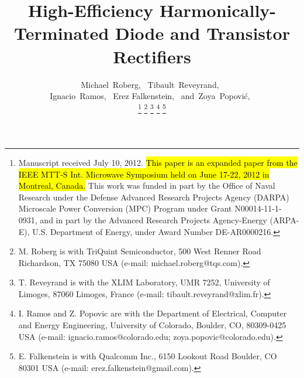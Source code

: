     \title{High-Efficiency Harmonically-Terminated Diode and Transistor Rectifiers}
  \author{Michael~Roberg,~
      Tibault~Reveyrand,~\\
      Ignacio~Ramos,~
      Erez Falkenstein,~
      and~Zoya~Popovi\'c,~%

  \thanks{Manuscript received July 10, 2012. \hl{This paper is an expanded paper from the IEEE MTT-S Int. Microwave Symposium held on June 17-22, 2012 in Montreal, Canada.} This work was funded in part by the Office of Naval Research under the Defense Advanced Research Projects Agency (DARPA) Microscale Power Conversion (MPC) Program under Grant N00014-11-1-0931, and in part by the Advanced Research Projects Agency-Energy (ARPA-E), U.S. Department of Energy, under Award Number DE-AR0000216.}
  \thanks{M. Roberg is with TriQuint Semiconductor, 500 West Renner Road Richardson, TX 75080 USA (e-mail: michael.roberg@tqs.com).}%
  \thanks{T. Reveyrand is with the XLIM Laboratory, UMR 7252, University of Limoges, 87060 Limoges, France (e-mail: tibault.reveyrand@xlim.fr).}%
  \thanks{I. Ramos and Z. Popovic are with the Department of Electrical, Computer and Energy Engineering, University of Colorado, Boulder, CO, 80309-0425 USA (e-mail: ignacio.ramos@colorado.edu; zoya.popovic@colorado.edu).}%
  \thanks{E. Falkenstein is with Qualcomm Inc., 6150 Lookout Road
Boulder, CO 80301 USA (e-mail: erez.falkenstein@gmail.com).}}




\maketitle



